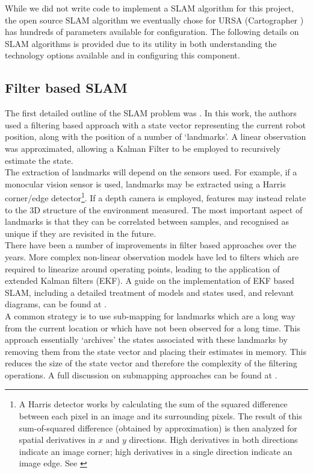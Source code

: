 \documentclass[capstone_report.tex]{subfiles}
\begin{document}
While we did not write code to implement a SLAM algorithm for this project, the open source SLAM algorithm we eventually chose for URSA (Cartographer \cite{cart}) has hundreds of parameters available for configuration. The following details on SLAM algorithms is provided due to its utility in both understanding the technology options available and in configuring this component.

\subsection{Filter based SLAM}
The first detailed outline of the SLAM problem was \cite{smithcheese}. In this work, the authors used a filtering based approach with a state vector representing the current robot position, along with the position of a number of `landmarks'. A linear observation was approximated, allowing a Kalman Filter to be employed to recursively estimate the state.\\

The extraction of landmarks will depend on the sensors used. For example, if a monocular vision sensor is used, landmarks may be extracted using a Harris corner/edge detector\footnote{A Harris detector works by calculating the sum of the squared difference between each pixel in an image and its surrounding pixels. The result of this sum-of-squared difference (obtained by approximation) is then analyzed for spatial derivatives in $x$ and $y$ directions. High derivatives in both directions indicate an image corner; high derivatives in a single direction indicate an image edge. See \cite{harris}}. If a depth camera is employed, features may instead relate to the 3D structure of the environment measured. The most important aspect of landmarks is that they can be correlated between samples, and recognised as unique if they are revisited in the future.\\

There have been a number of improvements in filter based approaches over the years. More complex non-linear observation models have led to filters which are required to linearize around operating points, leading to the application of extended Kalman filters (EKF). A guide on the implementation of EKF based SLAM, including a detailed treatment of models and states used, and relevant diagrams, can be found at \cite{ekftutorial}.\\ 

A common strategy is to use sub-mapping for landmarks which are a long way from the current location or which have not been observed for a long time. This approach essentially `archives' the states associated with these landmarks by removing them from the state vector and placing their estimates in memory. This reduces the size of the state vector and therefore the complexity of the filtering operations. A full discussion on submapping approaches can be found at \cite{slamoverview}.
\end{document}

